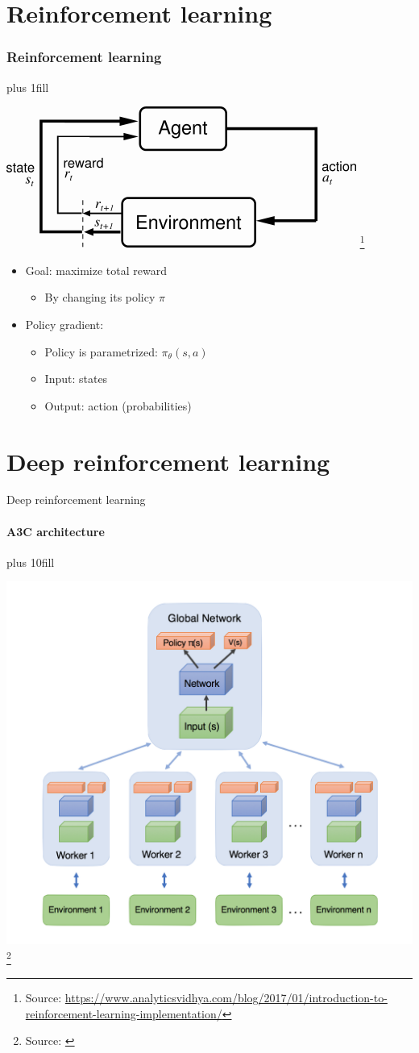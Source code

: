 \section{Reinforcement learning}
\begin{frame}[fragile]\frametitle{Reinforcement learning}
\vskip0pt plus 1fill
\begin{center}
    \includegraphics[width=.7\linewidth]{reinforcementlearning.png}
    \footnote{Source: \url{https://www.analyticsvidhya.com/blog/2017/01/introduction-to-reinforcement-learning-implementation/}}
\end{center}
\begin{itemize}
    \item Goal: maximize total reward
    \begin{itemize}
        \item By changing its policy $\pi$
    \end{itemize}
    \item Policy gradient:
    \begin{itemize}
        \item Policy is parametrized: $\pi_\theta(s,a)$
        \item Input: states
        \item Output: action (probabilities)
    \end{itemize}
\end{itemize}
\end{frame}

\section{Deep reinforcement learning}
\begin{frame}[fragile]{Deep reinforcement learning}
\framesubtitle{A3C architecture}
\vskip0pt plus 10fill
\begin{center}
    \includegraphics[width=.7\linewidth]{A3Carchitecture} \footnote{Source: \cite{Juliani2016A3C}}
\end{center}
\end{frame}

